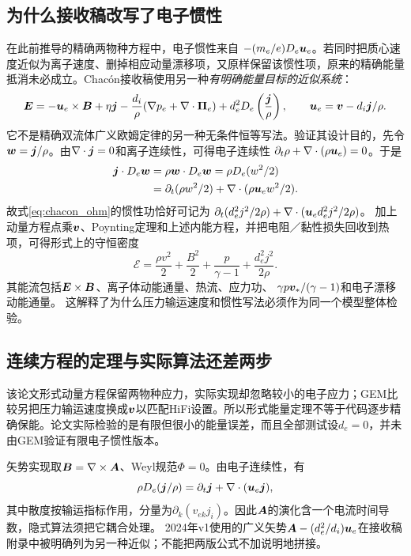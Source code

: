 \documentclass[UTF8,a4paper,11pt,openany,fontset=fandol]{ctexbook}
\begin{document}
\subsection{为什么接收稿改写了电子惯性}
在此前推导的精确两物种方程中，电子惯性来自
$-(m_e/e)D_e\bm{u}_e$。若同时把质心速度近似为离子速度、删掉相应动量漂移项，又原样保留该惯性项，原来的精确能量抵消未必成立。Chacón接收稿使用另一种\emph{有明确能量目标的近似系统}：
\begin{equation}
 \bm{E}=-\bm{u}_e\times\bm{B}+\eta\bm{j}
 -\frac{d_i}{\rho}(\nabla p_e+\nabla\cdot\bm{\Pi}_e)
 +d_e^2D_e\left(\frac{\bm{j}}{\rho}\right),
 \qquad \bm{u}_e=\bm{v}-d_i\bm{j}/\rho.
 \label{eq:chacon_ohm}
\end{equation}
它不是精确双流体广义欧姆定律的另一种无条件恒等写法。验证其设计目的，先令$\bm{w}=\bm{j}/\rho$。由$\nabla\cdot\bm{j}=0$和离子连续性，可得电子连续性
$\partial_t\rho+\nabla\cdot(\rho\bm{u}_e)=0$。于是
\begin{align}
 \bm{j}\cdot D_e\bm{w}
 &=\rho\bm{w}\cdot D_e\bm{w}=\rho D_e(w^2/2)\nonumber\\
 &=\partial_t(\rho w^2/2)+\nabla\cdot(\rho\bm{u}_e w^2/2).
 \label{eq:current_energy}
\end{align}
故式\eqref{eq:chacon_ohm}的惯性功恰好可记为
$\partial_t(d_e^2j^2/2\rho)+\nabla\cdot(\bm{u}_e d_e^2j^2/2\rho)$。
加上动量方程点乘$\bm{v}$、Poynting定理和上述内能方程，并把电阻／黏性损失回收到热项，可得形式上的守恒密度
\begin{equation}
 \mathcal E=\frac{\rho v^2}{2}+\frac{B^2}{2}
 +\frac{p}{\gamma-1}+\frac{d_e^2j^2}{2\rho}.
\end{equation}
其能流包括$\bm{E}\times\bm{B}$、离子体动能通量、热流、应力功、
$\gamma p\bm{v}_*/(\gamma-1)$和电子漂移动能通量。
这解释了为什么压力输运速度和惯性写法必须作为同一个模型整体检验。

\subsection{连续方程的定理与实际算法还差两步}
该论文形式动量方程保留两物种应力，实际实现却忽略较小的电子应力；GEM比较另把压力输运速度换成$\bm{v}$以匹配HiFi设置。所以形式能量定理不等于代码逐步精确保能。论文实际检验的是有限但很小的能量误差，而且全部测试设$d_e=0$，并未由GEM验证有限电子惯性版本。

矢势实现取$\bm{B}=\nabla\times\bm{A}$、Weyl规范$\Phi=0$。由电子连续性，有
\begin{equation}
 \rho D_e(\bm{j}/\rho)=\partial_t\bm{j}
 +\nabla\cdot(\bm{u}_e\bm{j}),
\end{equation}
其中散度按输运指标作用，分量为$\partial_k(v_{ek}j_i)$。因此$\bm{A}$的演化含一个电流时间导数，隐式算法须把它耦合处理。
2024年v1使用的广义矢势$\bm{A}-(d_e^2/d_i)\bm{u}_e$在接收稿附录中被明确列为另一种近似；不能把两版公式不加说明地拼接。
\end{document}
